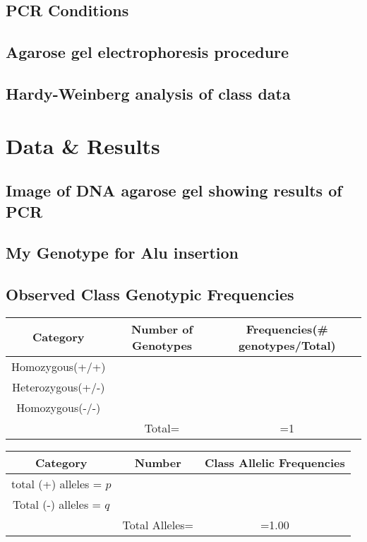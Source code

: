 \documentclass[paper=a4, fontsize=11pt]{scrartcl} %
\numberwithin{equation}{section} %
\numberwithin{figure}{section} %
\numberwithin{table}{section} %
\begin{document}
\subsection{PCR Conditions}
\subsection{Agarose gel electrophoresis procedure}
\subsection{Hardy-Weinberg analysis of class data}





\section{Data \& Results}

\subsection{Image of DNA agarose gel showing results of PCR}
\subsection{My Genotype for Alu insertion}
\subsection{Observed Class Genotypic Frequencies}
\newpage
\begin{tabular}{|c|c|c|}
	
	\hline Category  & Number of Genotypes & Frequencies(\# genotypes/Total)  \\ 
	\hline  Homozygous(+/+)&  &  \\ 
	\hline  Heterozygous(+/-)&  &  \\ 
	\hline  Homozygous(-/-)&  &  \\ 
	\hline  & Total= & =1  \\ 
	\hline 
\end{tabular} 

\begin{tabular}{|c|c|c|}
	
	\hline Category  & Number & Class Allelic Frequencies  \\ 
	\hline  total (+) alleles = $p$&  &  \\ 
	\hline  Total (-) alleles = $q$ &  &  \\ 

	\hline  & Total Alleles= & =1.00  \\ 
	\hline 
\end{tabular} 
\end{document}
